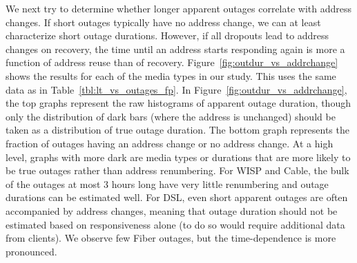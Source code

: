 We next try to determine whether longer apparent outages
correlate with address changes.  If short outages typically
have no address change, we can at least characterize short
outage durations.  However, if all dropouts lead to address
changes on recovery, the time until an address starts
responding again is more a function of address reuse than of
recovery.  Figure~\ref{fig:outdur_vs_addrchange} shows the
results for each of the media types in our study.  This uses
the same data as in Table~\ref{tbl:lt_vs_outages_fp}.  In
Figure~\ref{fig:outdur_vs_addrchange}, the top graphs
represent the raw histograms of apparent outage duration,
though only the distribution of dark bars (where the address
is unchanged) should be taken as a distribution of true
outage duration.  The bottom graph represents the fraction
of outages having an address change or no address change.
At a high level, graphs with more dark are media types or
durations that are more likely to be true outages rather
than address renumbering.  For WISP and Cable, the bulk of
the outages at most 3 hours long have very little
renumbering and outage durations can be estimated well.  For
DSL, even short apparent outages are often accompanied by
address changes, meaning that outage duration should not be
estimated based on responsiveness alone (to do so would
require additional data from clients).  We observe few Fiber
outages, but the time-dependence is more pronounced.

